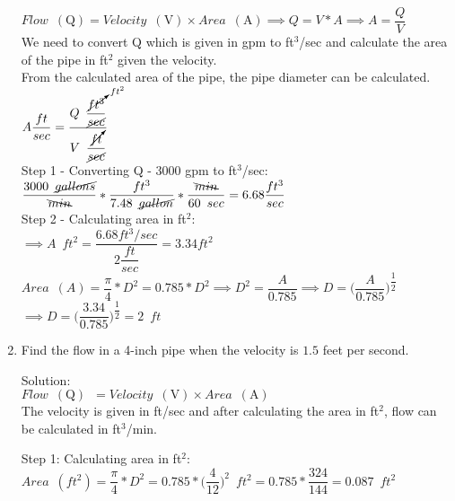 \begin{enumerate}
$Flow \enspace(\mathrm{Q})= Velocity \enspace(\mathrm{V})  \times Area \enspace(\mathrm{A}) \implies Q=V*A \implies A=\dfrac{Q}{V}$\\
We need to convert Q which is given in gpm to ft${^3}$/sec and calculate the area of the pipe in ft${^2}$ given the velocity.\\
From the calculated area of the pipe, the pipe diameter can be calculated.\\
\vspace{0.2cm}
$ A \dfrac{ft}{sec} = \dfrac{Q \enspace \dfrac{\cancelto{ft^2}{ft^3}}{\cancel{sec}}}{V \enspace \dfrac{\cancelto{}{ft}}{\cancel{sec}}}$\\
\vspace{0.2cm}
Step 1 - Converting Q - 3000 gpm to ft${^3}$/sec:\\
\vspace{0.2cm}
$\dfrac{3000 \enspace \cancel{gallons}}{\bcancel{min}}*\dfrac{ft^3}{7.48 \enspace \cancel{gallon}}*\dfrac{\bcancel{min}}{60 \enspace sec}=6.68\dfrac{ft^3}{sec}$\\
\vspace{0.2cm}
Step 2 - Calculating area in ft${^2}$:\\
\vspace{0.2cm}
$\implies A \enspace ft^2 = \dfrac{ 6.68 ft^3/sec}{2 \dfrac{ft}{sec}} = 3.34 ft^2$\\
\vspace{0.3cm} 
$Area \enspace (A)= \dfrac{\pi}{4}*D^2 = 0.785*D^2 \implies D^2=\dfrac{A}{0.785} \implies D=\Big(\dfrac{A }{0.785}\Big)^{\dfrac{1}{2}}$\\
$\implies D=\Big(\dfrac{3.34}{0.785}\Big)^{\dfrac{1}{2}}=\boxed{2 \enspace ft}$\\
\vspace{0.2cm}

\item Find the flow in a 4-inch pipe when the velocity is $1.5$ feet per second.

Solution:\\
$Flow \enspace(\mathrm{Q}) \enspace = Velocity \enspace(\mathrm{V})  \times Area \enspace(\mathrm{A})$\\
\vspace{0.2cm}
The velocity is given in ft/sec and after calculating the area in ft$^2$, flow can be calculated in ft$^3$/min.\\
\vspace{0.2cm}

\vspace{0.2cm}
Step 1:  Calculating area in ft${^2}$:\\
\vspace{0.2cm}
$Area \enspace (ft^2)= \dfrac{\pi}{4}*D^2= 0.785*\Big(\dfrac{4}{12}\Big)^2 \enspace ft^2=0.785*\dfrac{324}{144}=0.087 \enspace ft^2$\\
\vspace{0.2cm}


\end{enumerate}
